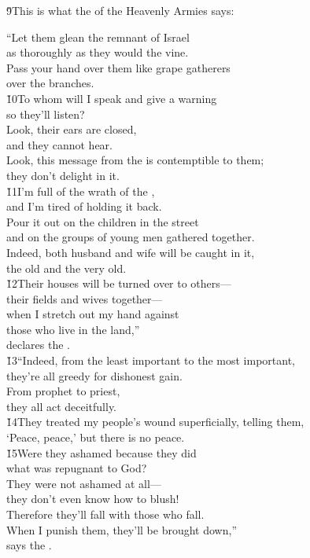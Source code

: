 \v{9}This is what the  of the Heavenly Armies says:

\begin{poetry}
\poeml ``Let them glean the remnant of Israel \\
\poemll    as thoroughly as they would the vine. \\
\poeml Pass your hand over them like grape gatherers \\
\poemll    over the branches. \\
\poeml \v{10}To whom will I speak and give a warning \\
\poemll    so they'll listen? \\
\poeml Look, their ears are closed, \\
\poemll    and they cannot hear. \\
\poeml Look, this message from the  is contemptible to them; \\
\poemll    they don't delight in it. \\
\poeml \v{11}I'm full of the wrath of the , \\
\poemll    and I'm tired of holding it back. \\
\poeml Pour it out on the children in the street \\
\poemll    and on the groups of young men gathered together. \\
\poeml Indeed, both husband and wife will be caught in it, \\
\poemll    the old and the very old. \\
\poeml \v{12}Their houses will be turned over to others--- \\
\poemll    their fields and wives together--- \\
\poeml when I stretch out my hand against \\
\poemll    those who live in the land,'' \\
\poemlll       declares the . \\
\poeml \v{13}``Indeed, from the least important to the most important, \\
\poemll    they're all greedy for dishonest gain. \\
\poeml From prophet to priest, \\
\poemll    they all act deceitfully. \\
\poeml \v{14}They treated my people's wound superficially, telling them, \\
\poemll    `Peace, peace,' but there is no peace. \\
\poeml \v{15}Were they ashamed because they did \\
\poemll    what was repugnant to God? \\
\poeml They were not ashamed at all--- \\
\poemll    they don't even know how to blush! \\
\poeml Therefore they'll fall with those who fall. \\
\poemll    When I punish them, they'll be brought down,'' \\
\poemlll       says the .
\end{poetry}

